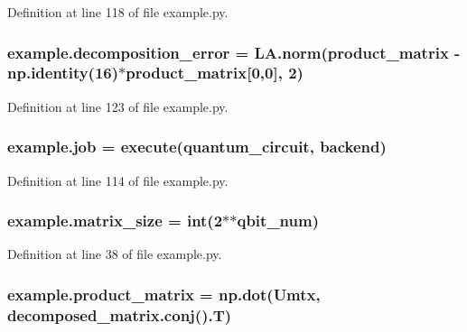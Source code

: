 Definition at line 118 of file example.\+py.

\subsubsection[{\texorpdfstring{decomposition\+\_\+error}{decomposition_error}}]{\setlength{\rightskip}{0pt plus 5cm}example.\+decomposition\+\_\+error = L\+A.\+norm({\bf product\+\_\+matrix} -\/ np.\+identity(16)$\ast${\bf product\+\_\+matrix}\mbox{[}0,0\mbox{]}, 2)}\hypertarget{namespaceexample_af790bb908348ee47307d4eb3668aa5a0}{}\label{namespaceexample_af790bb908348ee47307d4eb3668aa5a0}


Definition at line 123 of file example.\+py.

\subsubsection[{\texorpdfstring{job}{job}}]{\setlength{\rightskip}{0pt plus 5cm}example.\+job = execute({\bf quantum\+\_\+circuit}, {\bf backend})}\hypertarget{namespaceexample_acc723d25fd7224c46ee94d2866c9f96a}{}\label{namespaceexample_acc723d25fd7224c46ee94d2866c9f96a}


Definition at line 114 of file example.\+py.

\subsubsection[{\texorpdfstring{matrix\+\_\+size}{matrix_size}}]{\setlength{\rightskip}{0pt plus 5cm}example.\+matrix\+\_\+size = int(2$\ast$$\ast${\bf qbit\+\_\+num})}\hypertarget{namespaceexample_ae04701779f635cdceb8bdee5c8ff074f}{}\label{namespaceexample_ae04701779f635cdceb8bdee5c8ff074f}


Definition at line 38 of file example.\+py.

\subsubsection[{\texorpdfstring{product\+\_\+matrix}{product_matrix}}]{\setlength{\rightskip}{0pt plus 5cm}example.\+product\+\_\+matrix = np.\+dot({\bf Umtx}, decomposed\+\_\+matrix.\+conj().T)}\hypertarget{namespaceexample_ac1039984599e8ffdf0b609b0e2790c1a}{}\label{namespaceexample_ac1039984599e8ffdf0b609b0e2790c1a}


